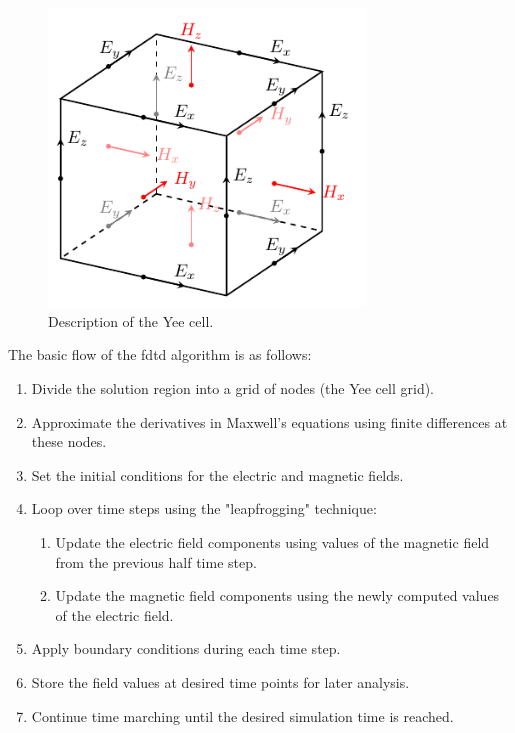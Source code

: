 \begin{figure}[H]
  \label{fig:yee}
  \centering
  \includegraphics[width=0.75\textwidth]{figures/yee.pdf}
  \caption{Description of the Yee cell.}
\end{figure}

The basic flow of the \gls{fdtd} algorithm is as follows:
\begin{enumerate}
\item Divide the solution region into a grid of nodes (the Yee cell grid).
\item Approximate the derivatives in Maxwell's equations using finite differences at these nodes.
\item Set the initial conditions for the electric and magnetic fields.
\item Loop over time steps using the "leapfrogging" technique:
\begin{enumerate}
  \item Update the electric field components using values of the magnetic field from the previous half time step.
  \item Update the magnetic field components using the newly computed values of the electric field.
\end{enumerate}
\item Apply boundary conditions during each time step.
\item Store the field values at desired time points for later analysis.
\item Continue time marching until the desired simulation time is reached.
\end{enumerate}


